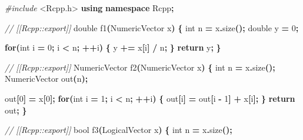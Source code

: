 \documentclass[
]{book}
\newenvironment{Shaded}{\begin{snugshade}}{\end{snugshade}}
\newcommand{\CommentTok}[1]{\textcolor[rgb]{0.56,0.35,0.01}{\textit{#1}}}
\newcommand{\ControlFlowTok}[1]{\textcolor[rgb]{0.13,0.29,0.53}{\textbf{#1}}}
\newcommand{\DataTypeTok}[1]{\textcolor[rgb]{0.13,0.29,0.53}{#1}}
\newcommand{\DecValTok}[1]{\textcolor[rgb]{0.00,0.00,0.81}{#1}}
\newcommand{\ImportTok}[1]{#1}
\newcommand{\KeywordTok}[1]{\textcolor[rgb]{0.13,0.29,0.53}{\textbf{#1}}}
\newcommand{\NormalTok}[1]{#1}
\newcommand{\OperatorTok}[1]{\textcolor[rgb]{0.81,0.36,0.00}{\textbf{#1}}}
\newcommand{\PreprocessorTok}[1]{\textcolor[rgb]{0.56,0.35,0.01}{\textit{#1}}}
\begin{document}
\begin{Shaded}
\begin{Highlighting}[]
\PreprocessorTok{\#include }\ImportTok{\textless{}Rcpp.h\textgreater{}}
\KeywordTok{using} \KeywordTok{namespace}\NormalTok{ Rcpp}\OperatorTok{;}

\CommentTok{// [[Rcpp::export]]}
\DataTypeTok{double}\NormalTok{ f1}\OperatorTok{(}\NormalTok{NumericVector x}\OperatorTok{)} \OperatorTok{\{}
  \DataTypeTok{int}\NormalTok{ n }\OperatorTok{=}\NormalTok{ x}\OperatorTok{.}\NormalTok{size}\OperatorTok{();}
  \DataTypeTok{double}\NormalTok{ y }\OperatorTok{=} \DecValTok{0}\OperatorTok{;}

  \ControlFlowTok{for}\OperatorTok{(}\DataTypeTok{int}\NormalTok{ i }\OperatorTok{=} \DecValTok{0}\OperatorTok{;}\NormalTok{ i }\OperatorTok{\textless{}}\NormalTok{ n}\OperatorTok{;} \OperatorTok{++}\NormalTok{i}\OperatorTok{)} \OperatorTok{\{}
\NormalTok{    y }\OperatorTok{+=}\NormalTok{ x}\OperatorTok{[}\NormalTok{i}\OperatorTok{]} \OperatorTok{/}\NormalTok{ n}\OperatorTok{;}
  \OperatorTok{\}}
  \ControlFlowTok{return}\NormalTok{ y}\OperatorTok{;}
\OperatorTok{\}}

\CommentTok{// [[Rcpp::export]]}
\NormalTok{NumericVector f2}\OperatorTok{(}\NormalTok{NumericVector x}\OperatorTok{)} \OperatorTok{\{}
  \DataTypeTok{int}\NormalTok{ n }\OperatorTok{=}\NormalTok{ x}\OperatorTok{.}\NormalTok{size}\OperatorTok{();}
\NormalTok{  NumericVector out}\OperatorTok{(}\NormalTok{n}\OperatorTok{);}

\NormalTok{  out}\OperatorTok{[}\DecValTok{0}\OperatorTok{]} \OperatorTok{=}\NormalTok{ x}\OperatorTok{[}\DecValTok{0}\OperatorTok{];}
  \ControlFlowTok{for}\OperatorTok{(}\DataTypeTok{int}\NormalTok{ i }\OperatorTok{=} \DecValTok{1}\OperatorTok{;}\NormalTok{ i }\OperatorTok{\textless{}}\NormalTok{ n}\OperatorTok{;} \OperatorTok{++}\NormalTok{i}\OperatorTok{)} \OperatorTok{\{}
\NormalTok{    out}\OperatorTok{[}\NormalTok{i}\OperatorTok{]} \OperatorTok{=}\NormalTok{ out}\OperatorTok{[}\NormalTok{i }\OperatorTok{{-}} \DecValTok{1}\OperatorTok{]} \OperatorTok{+}\NormalTok{ x}\OperatorTok{[}\NormalTok{i}\OperatorTok{];}
  \OperatorTok{\}}
  \ControlFlowTok{return}\NormalTok{ out}\OperatorTok{;}
\OperatorTok{\}}

\CommentTok{// [[Rcpp::export]]}
\DataTypeTok{bool}\NormalTok{ f3}\OperatorTok{(}\NormalTok{LogicalVector x}\OperatorTok{)} \OperatorTok{\{}
  \DataTypeTok{int}\NormalTok{ n }\OperatorTok{=}\NormalTok{ x}\OperatorTok{.}\NormalTok{size}\OperatorTok{();}


\end{Highlighting}
\end{Shaded}
\end{document}
